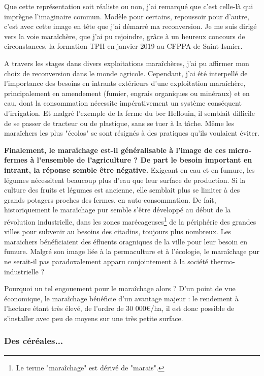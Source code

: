\documentclass{book}
\begin{document}
Que cette représentation soit réaliste ou non, j'ai remarqué que c'est celle-là qui imprègne l'imaginaire commun. Modèle pour certains, repoussoir pour d'autre, c'est  avec cette image en tête que j'ai démarré ma reconversion. Je me suis dirigé vers la voie maraîchère, que j'ai pu rejoindre, grâce à un heureux concours de circonstances, la formation TPH en janvier 2019 au CFPPA de Saint-Ismier. 

A travers les stages dans divers exploitations maraîchères, j'ai pu affirmer mon choix de reconversion dans le monde agricole. Cependant, j'ai été interpellé de l'importance des besoins en intrants extérieurs d'une exploitation maraîchère, principalement en amendement (fumier, engrais organiques ou minéraux) et en eau, dont la consommation nécessite impérativement un système conséquent d'irrigation. Et malgré l'exemple de la ferme du bec Hellouin, il semblait difficile de se passer de tracteur ou de plastique, sans se tuer à la tâche. Même les maraîchers les plus "écolos" se sont résignés à des pratiques qu'ils voulaient éviter.

\textbf{Finalement, le maraîchage est-il généralisable à l'image de ces micro-fermes à l'ensemble de l'agriculture ? De part le besoin important en intrant, la réponse semble être négative.} Exigeant en eau et en fumure, les légumes nécessitent beaucoup plus d'eau que leur surface de production. Si la culture des fruits et légumes est ancienne, elle semblait plus se limiter à des grands potagers proches des fermes, en auto-consommation. De fait, historiquement le maraîchage pur semble s'être développé au début de la révolution industrielle, dans les zones marécageuses\footnote{Le terme "maraîchage" est dérivé de "marais".} de la périphérie des grandes villes pour subvenir au besoins des citadins, toujours plus nombreux. Les maraichers bénéficiaient des éfluents oragniques de la ville pour leur besoin en fumure. Malgré son image liée à la permaculture et à l'écologie, le maraîchage pur ne serait-il pas paradoxalement apparu conjointement à la société thermo-industrielle ?

Pourquoi un tel engouement pour le maraîchage alors ? D'un point de vue économique, le maraîchage bénéficie d'un avantage majeur : le rendement à l'hectare étant très élevé, de l'ordre de 30 000\euro{}/ha, il est donc possible de s'installer avec peu de moyens sur une très petite surface. 

\subsubsection{Des céréales...}
\end{document}
